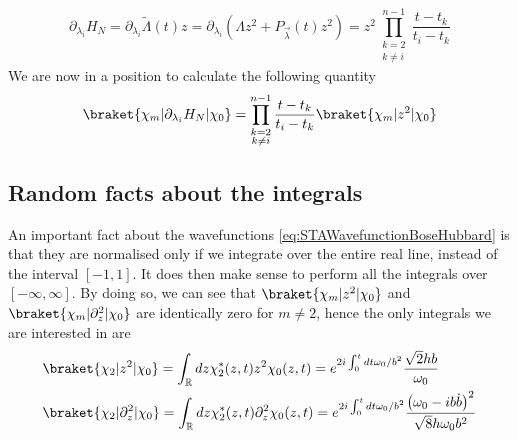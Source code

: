 \begin{equation}
	\label{eq:GradientLambda}
	\partial_{\lambda_{i}} H_{N}=\partial_{\lambda_{i}} \tilde{ \Lambda }(t)z = \partial_{\lambda_{i}} \left(\Lambda z^2 + P_{\vec{ \lambda }}(t)z^2    \right) =z^2\prod_{\substack{k=2\\k\neq i }}^{n-1}\frac{t-t_{k}}{t_{i} - t_{k}}
\end{equation}
We are now in a position to calculate the following quantity
\begin{equation}
	\label{eq:KnOverSpace}
	\braket{\chi_{m}|\partial_{\lambda_{i}} H_{N}|\chi_{0}} = \prod_{\substack{k=2\\k\neq i }}^{n-1}\frac{t-t_{k}}{t_{i} - t_{k}} \braket{\chi_{m}|z^2 |\chi_{0}}
\end{equation}
\subsection{Random facts about the integrals}
An important fact about the wavefunctions \cref{eq:STAWavefunctionBoseHubbard} is that they are normalised only if we integrate over the entire real line, instead of the interval $ [-1,1] $.
It does then make sense to perform all the integrals over $ [-\infty, \infty] $.
By doing so, we can see that $ \braket{\chi_{m}|z^2|\chi_{0}} $ and $ \braket{\chi_{m}|\partial_z^2|\chi_{0}} $ are identically zero for $ m \neq 2 $, hence the only integrals we are interested in are
\begin{align}
	  & \braket{\chi_{2}|z^2|\chi_{0}} =
	\int_{\mathbb{R}}dz \chi_{2}^{*}(z,t) z^2 \chi_{0}(z,t) =
	e^{2i\int_{0}^{t}dt\omega_{0}/b^2 }\frac{\sqrt{2}h b   }{\omega_0}\\
	  & \braket{\chi_{2}|\partial_z^2|\chi_{0}} =
	\int_{\mathbb{R}}dz \chi_{2}^{*}(z,t) \partial_z^2 \chi_{0}(z,t)=
	e^{2i\int_{0}^{t}dt\omega_{0}/b^2 }\frac{\left(\omega_0 - ib\dot{b}\right)^2}{ \sqrt{8} h\omega_0b^2 }
\end{align}

